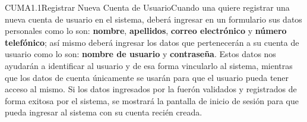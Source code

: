 
\begin{UseCase}{CUMA1.1}{Registrar Nueva Cuenta de Usuario}{Cuando una  quiere registrar una nueva cuenta de usuario en el sistema, deberá ingresar en un formulario sus datos personales como lo son: \textbf{nombre}, \textbf{apellidos}, \textbf{correo electrónico} y \textbf{número telefónico}; así mismo deberá ingresar los datos que pertenecerán a su cuenta de usuario como lo son: \textbf{nombre de usuario} y \textbf{contraseña}. Estos datos nos ayudarán a identificar al usuario y de esa forma vincularlo al sistema, mientras que los datos de cuenta únicamente se usarán para que el usuario pueda tener acceso al mismo. Si los datos ingresados por la  fuerón validados y registrados de forma exitosa por el sistema, se mostrará la pantalla de inicio de sesión para que pueda ingresar al sistema con su cuenta recién creada.\\}
	


\end{UseCase}
